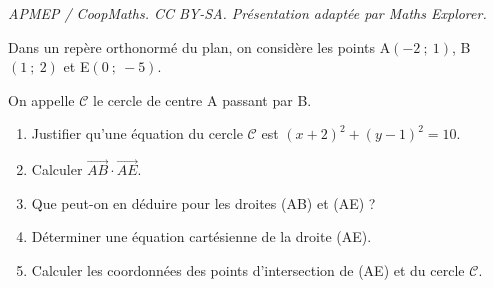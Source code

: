 \documentclass[10pt]{article}
\providecommand{\vv}[1]{\overrightarrow{#1}}
\providecommand{\vv}[1]{{\overrightarrow{#1}}}
\begin{document}
\noindent\textit{APMEP / CoopMaths. CC BY-SA. Présentation adaptée par Maths Explorer.}\par\medskip
\medskip

Dans un repère orthonormé du plan, on considère les points A$(-2~;~1)$, B$(1~;~2)$ et
E$(0~;~-5)$. 

On appelle $\mathscr{C}$ le cercle de centre A passant par B.

\medskip

\begin{enumerate}
\item Justifier qu'une équation du cercle $\mathscr{C}$ est $(x + 2)^2 + (y - 1)^2 = 10.$
\item Calculer $\vv{AB}\cdot\vv{AE}$.
\item Que peut-on en déduire pour les droites (AB) et (AE) ?
\item Déterminer une équation cartésienne de la droite (AE).
\item Calculer les coordonnées des points d'intersection de (AE) et du cercle $\mathscr{C}$.
\end{enumerate}
\end{document}

